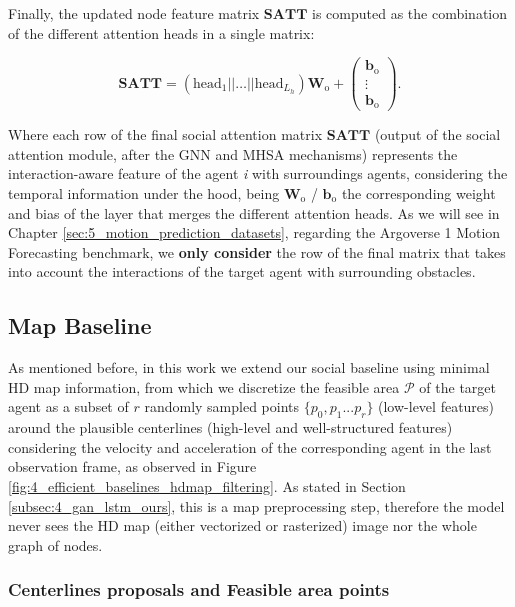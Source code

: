Finally, the updated node feature matrix $\mathbf{SATT}$ is computed as the combination of the different attention heads in a single matrix:

\begin{equation}
	\mathbf{SATT} = (\mathrm{head}_1 || \dots || \mathrm{head}_{L_h}) \mathbf{W}_\mathrm{o} + 
	\begin{pmatrix}
		\mathbf{b}_\mathrm{o}\\
		\vdots \\
		\mathbf{b}_\mathrm{o}
	\end{pmatrix}.
\end{equation}

Where each row of the final social attention matrix $\mathbf{SATT}$ (output of the social attention module, after the GNN and MHSA mechanisms) represents the interaction-aware feature of the agent \textit{i} with surroundings agents, considering the temporal information under the hood, being $\mathbf{W}_\mathrm{o}$ / $\mathbf{b}_\mathrm{o}$ the corresponding weight and bias of the layer that merges the different attention heads. As we will see in Chapter \ref{sec:5_motion_prediction_datasets}, regarding the Argoverse 1 Motion Forecasting benchmark, we \textbf{only consider} the row of the final matrix that takes into account the interactions of the target agent with surrounding obstacles.

\subsection{Map Baseline} 
\label{subsubsec:4_efficient_baselines_map_baseline}

As mentioned before, in this work we extend our social baseline using minimal HD map information, from which we discretize the feasible area $\mathcal{P}$ of the target agent as a subset of $r$ randomly sampled points $\{p_0 , p_1 ... p_r\}$ (low-level features) around the plausible centerlines (high-level and well-structured features) considering the velocity and acceleration of the corresponding agent in the last observation frame, as observed in Figure \ref{fig:4_efficient_baselines_hdmap_filtering}. As stated in Section \ref{subsec:4_gan_lstm_ours}, this is a map preprocessing step, therefore the model never sees the HD map (either vectorized or rasterized) image nor the whole graph of nodes.

\subsubsection{Centerlines proposals and Feasible area points} 
\label{subsubsec:4_efficient_baselines_preprocessing_map}

